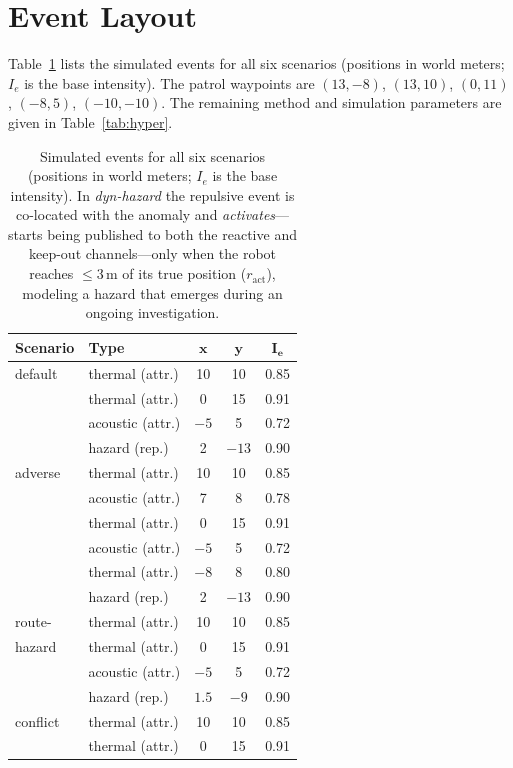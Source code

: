 \section{Event Layout}
\label{app:params}
Table~\ref{tab:events} lists the simulated events for all six scenarios (positions
in world meters; $I_e$ is the base intensity). The patrol waypoints are
$(13,-8)$, $(13,10)$, $(0,11)$, $(-8,5)$, $(-10,-10)$. The remaining method and
simulation parameters are given in Table~\ref{tab:hyper}.

\begin{table}[h]
\centering
\caption{Simulated events for all six scenarios (positions in world meters;
$I_e$ is the base intensity). In \emph{dyn-hazard} the repulsive event is
co-located with the anomaly and \emph{activates}---starts being published to
both the reactive and keep-out channels---only when the robot reaches
$\le3$\,m of its true position ($r_{\mathrm{act}}$), modeling a hazard that
emerges during an ongoing investigation.}
\label{tab:events}
\begin{tabular}{llccc}
\hline
\textbf{Scenario} & \textbf{Type} & $\bm{x}$ & $\bm{y}$ & $\bm{I_e}$\\
\hline
default & thermal (attr.)  & 10   & 10  & 0.85\\
        & thermal (attr.)  & 0    & 15  & 0.91\\
        & acoustic (attr.) & $-5$ & 5   & 0.72\\
        & hazard (rep.)    & 2    & $-13$ & 0.90\\
\hline
adverse & thermal (attr.)  & 10   & 10  & 0.85\\
        & acoustic (attr.) & 7    & 8   & 0.78\\
        & thermal (attr.)  & 0    & 15  & 0.91\\
        & acoustic (attr.) & $-5$ & 5   & 0.72\\
        & thermal (attr.)  & $-8$ & 8   & 0.80\\
        & hazard (rep.)    & 2    & $-13$ & 0.90\\
\hline
route- & thermal (attr.)  & 10   & 10  & 0.85\\
hazard  & thermal (attr.)  & 0    & 15  & 0.91\\
        & acoustic (attr.) & $-5$ & 5   & 0.72\\
        & hazard (rep.)    & $1.5$ & $-9$ & 0.90\\
\hline
conflict& thermal (attr.)  & 10   & 10  & 0.85\\
        & thermal (attr.)  & 0    & 15  & 0.91\\

\end{tabular}
\end{table}
